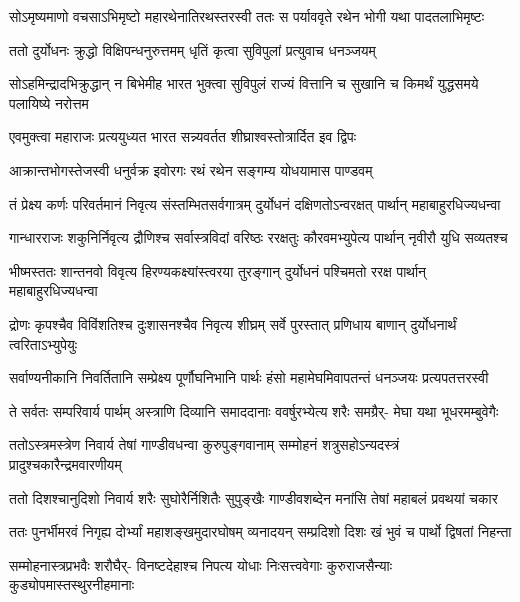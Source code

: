 \fourlineindentedshloka
{सोऽमृष्यमाणो वचसाऽभिमृष्टो}
{महारथेनातिरथस्तरस्वी}
{ततः स पर्याववृते रथेन}
{भोगी यथा पादतलाभिमृष्टः}


\twolineshloka
{ततो दुर्योधनः क्रुद्धो विक्षिपन्धनुरुत्तमम्}
{धृतिं कृत्वा सुविपुलां प्रत्युवाच धनञ्जयम्}


\threelineshloka
{सोऽहमिन्द्रादभिक्रुद्धान् न बिभेमीह भारत}
{भुक्त्वा सुविपुलं राज्यं वित्तानि च सुखानि च}
{किमर्थं युद्धसमये पलायिष्ये नरोत्तम}


\twolineshloka
{एवमुक्त्वा महाराजः प्रत्ययुध्यत भारत}
{सन्न्यवर्तत शीघ्राश्वस्तोत्रार्दित इव द्विपः}


\twolineshloka
{आक्रान्तभोगस्तेजस्वी धनुर्वक्र इवोरगः}
{रथं रथेन सङ्गम्य योधयामास पाण्डवम्}


\fourlineindentedshloka
{तं प्रेक्ष्य कर्णः परिवर्तमानं}
{निवृत्य संस्तम्भितसर्वगात्रम्}
{दुर्योधनं दक्षिणतोऽन्वरक्षत्}
{पार्थान् महाबाहुरधिज्यधन्वा}


\fourlineindentedshloka
{गान्धारराजः शकुनिर्निवृत्य}
{द्रौणिश्च सर्वास्त्रविदां वरिष्ठः}
{ररक्षतुः कौरवमभ्युपेत्य}
{पार्थान् नृवीरौ युधि सव्यतश्च}


\fourlineindentedshloka
{भीष्मस्ततः शान्तनवो विवृत्य}
{हिरण्यकक्ष्यांस्त्वरया तुरङ्गान्}
{दुर्योधनं पश्चिमतो ररक्ष}
{पार्थान् महाबाहुरधिज्यधन्वा}


\fourlineindentedshloka
{द्रोणः कृपश्चैव विविंशतिश्च}
{दुःशासनश्चैव निवृत्य शीघ्रम्}
{सर्वे पुरस्तात् प्रणिधाय बाणान्}
{दुर्योधनार्थं त्वरिताऽभ्युपेयुः}


\fourlineindentedshloka
{सर्वाण्यनीकानि निवर्तितानि}
{सम्प्रेक्ष्य पूर्णौघनिभानि पार्थः}
{हंसो महामेघमिवापतन्तं}
{धनञ्जयः प्रत्यपतत्तरस्वी}


\fourlineindentedshloka
{ते सर्वतः सम्परिवार्य पार्थम्}
{अस्त्राणि दिव्यानि समाददानाः}
{ववर्षुरभ्येत्य शरैः समग्रैर्-}
{मेघा यथा भूधरमम्बुवेगैः}


\fourlineindentedshloka
{ततोऽस्त्रमस्त्रेण निवार्य तेषां}
{गाण्डीवधन्वा कुरुपुङ्गवानाम्}
{सम्मोहनं शत्रुसहोऽन्यदस्त्रं}
{प्रादुश्चकारैन्द्रमवारणीयम्}


\fourlineindentedshloka
{ततो दिशश्चानुदिशो निवार्य}
{शरैः सुघोरैर्निशितैः सुपुङ्खैः}
{गाण्डीवशब्देन मनांसि तेषां}
{महाबलं प्रवथयां चकार}


\fourlineindentedshloka
{ततः पुनर्भीमरवं निगृह्य}
{दोर्भ्यां महाशङ्खमुदारघोषम्}
{व्यनादयन् सम्प्रदिशो दिशः खं}
{भुवं च पार्थो द्विषतां निहन्ता}


\fourlineindentedshloka
{सम्मोहनास्त्रप्रभवैः शरौघैर्-}
{विनष्टदेहाश्च निपत्य योधाः}
{निःसत्त्ववेगाः कुरुराजसैन्याः}
{कुड्योपमास्तस्थुरनीहमानाः}


